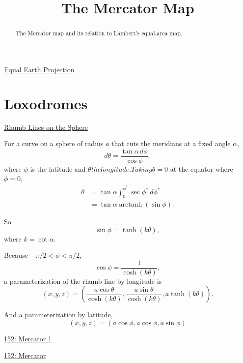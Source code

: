 \documentclass{ximera}
\title{The Mercator Map}
\begin{document}
\begin{abstract}
The Mercator map and its relation to Lambert's equal-area map.
\end{abstract}
\maketitle

\href{https://www.nytimes.com/2025/08/19/world/africa/africa-map-mercator.html}{Equal Earth Projection}


\section{Loxodromes}

\href{https://mathcurve.com/courbes3d.gb/loxodromie/sphereloxodromie.shtml}{Rhumb Lines on the Sphere}

For a curve on a sphere of radius $a$ that cuts the meridians at a fixed angle $\alpha$,
\[
  d\theta = \frac{\tan \alpha \, d\phi}{\cos\phi} ,
\]
where $\phi$ is the latitude and $\theta the longitude. Taking \theta = 0$ at the equator where $\phi=0$,
\begin{align*}
 \theta     &= \tan \alpha \int_0^{\phi^*} \sec \phi^* \, d\phi^*\\
               &= \tan \alpha \operatorname{arctanh}(\sin\phi) .
\end{align*}

So
\[
   \sin\phi = \operatorname{tanh}(k \theta),
\]
where $k=\cot\alpha$.

Because $-\pi/2 < \phi < \pi/2$,
\[
  \cos\phi =  \frac{1}{\cosh (k \theta)},
\]
a parameterization of the rhumb line by longitude is
\[
  (x,y,z) = \left( \frac{a\cos\theta}{\cosh(k\theta)} , \frac{a\sin\theta}{\cosh(k\theta)}  , a \tanh(k\theta)  \right) .
\]


And a parameterization by latitude,
\[
   (x,y,z) = \left(  a    \cos\phi  ,   a    \cos\phi    ,   a \sin \phi   \right)
\]

\begin{onlineOnly}
    \begin{center}
\end{center}
\end{onlineOnly}

\href{https://www.desmos.com/3d/6cqnjsuew7}{152: Mercator 1}


\begin{onlineOnly}
    \begin{center}
\end{center}
\end{onlineOnly}

\begin{onlineOnly}
    \begin{center}
\end{center}
\end{onlineOnly}

\href{https://www.geogebra.org/classic/mvp9zvge}{152: Mercator}
\end{document}
